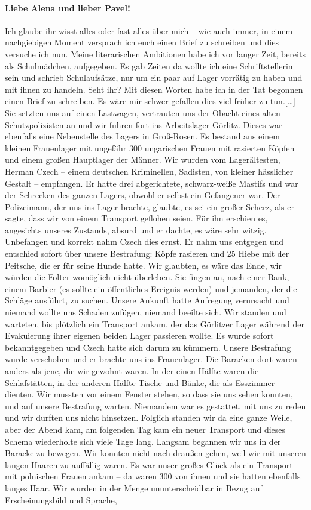 \paragraph{Liebe Alena und lieber Pavel!}
Ich glaube ihr wisst alles oder fast alles über mich -- wie auch immer, in einem nachgiebigen Moment versprach ich euch einen Brief zu schreiben und dies versuche ich nun. Meine literarischen Ambitionen habe ich vor langer Zeit, bereits als Schulmädchen, aufgegeben. Es gab Zeiten da wollte ich eine Schriftstellerin sein und schrieb Schulaufsätze, nur um ein paar auf Lager vorrätig zu haben und mit ihnen zu handeln. Seht ihr? Mit diesen Worten habe ich in der Tat begonnen einen Brief zu schreiben. Es wäre mir schwer gefallen dies viel früher zu tun.[\dots]
Sie setzten uns auf einen Lastwagen, vertrauten uns der Obacht eines alten Schutzpolizisten an und wir fuhren fort ins Arbeitslager Görlitz. Dieses war ebenfalls eine Nebenstelle des Lagers in Groß-Rosen. Es bestand aus einem kleinen Frauenlager mit ungefähr 300 ungarischen Frauen mit rasierten Köpfen und einem großen Hauptlager der Männer. Wir wurden vom Lagerältesten, Herman Czech -- einem deutschen Kriminellen, Sadisten, von kleiner hässlicher Gestalt -- empfangen. Er hatte drei abgerichtete, schwarz-weiße Mastifs und war der Schrecken des ganzen Lagers, obwohl er selbst ein Gefangener war. Der Polizeimann, der uns ins Lager brachte, glaubte, es sei ein großer Scherz, als er sagte, dass wir von einem Transport geflohen seien. Für ihn erschien es, angesichts unseres Zustands, absurd und er dachte, es wäre sehr witzig. Unbefangen und korrekt nahm Czech dies ernst. Er nahm uns entgegen und entschied sofort über unsere Bestrafung: Köpfe rasieren und 25 Hiebe mit der Peitsche, die er für seine Hunde hatte. Wir glaubten, es wäre das Ende, wir würden die Folter womöglich nicht überleben. Sie fingen an, nach einer Bank, einem Barbier (es sollte ein öffentliches Ereignis werden) und jemanden, der die Schläge ausführt, zu suchen. Unsere Ankunft hatte Aufregung verursacht und niemand wollte uns Schaden zufügen, niemand beeilte sich. Wir standen und warteten, bis plötzlich ein Transport ankam, der das Görlitzer Lager während der Evakuierung ihrer eigenen beiden Lager passieren wollte. Es wurde sofort bekanntgegeben und Czech hatte sich darum zu kümmern. Unsere Bestrafung wurde verschoben und er brachte uns ins Frauenlager. Die Baracken dort waren anders als jene, die wir gewohnt waren. In der einen Hälfte waren die Schlafstätten, in der anderen Hälfte Tische und Bänke, die als Esszimmer dienten. Wir mussten vor einem Fenster stehen, so dass sie uns sehen konnten, und auf unsere Bestrafung warten. Niemandem war es gestattet, mit uns zu reden und wir durften uns nicht hinsetzen. Folglich standen wir da eine ganze Weile, aber der Abend kam, am folgenden Tag kam ein neuer Transport und dieses Schema wiederholte sich viele Tage lang. Langsam begannen wir uns in der Baracke zu bewegen. Wir konnten nicht nach draußen gehen, weil wir mit unseren langen Haaren zu auffällig waren. Es war unser großes Glück als ein Transport mit polnischen Frauen ankam -- da waren 300 von ihnen und sie hatten ebenfalls langes Haar. Wir wurden in der Menge ununterscheidbar in Bezug auf Erscheinungsbild und Sprache, 